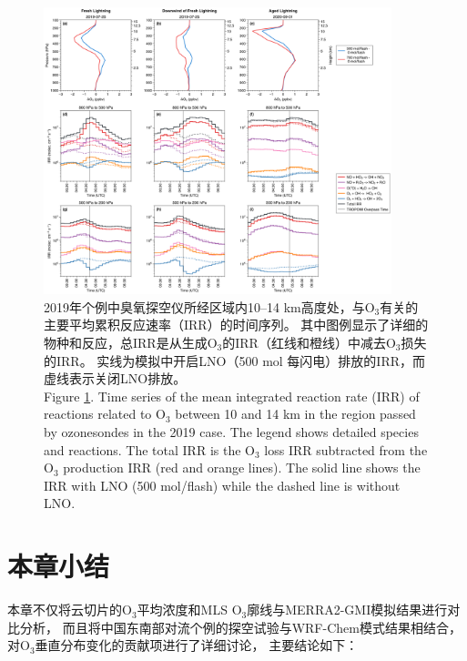 \begin{figure}[H]
\centering
\includegraphics[width=0.9\textwidth]{./figures/irr_timeseries.png}
\caption{
2019年个例中臭氧探空仪所经区域内10--14 km高度处，与O$_3$有关的主要平均累积反应速率（IRR）的时间序列。
其中图例显示了详细的物种和反应，总IRR是从生成O$_3$的IRR（红线和橙线）中减去O$_3$损失的IRR。
实线为模拟中开启LNO（500 mol 每闪电）排放的IRR，而虚线表示关闭LNO排放。\\
Figure \ref{fig:irr_timeseries}. Time series of the mean integrated reaction rate (IRR) of reactions related to O$_3$ between 10 and 14 km in the region passed by ozonesondes in the 2019 case.
The legend shows detailed species and reactions.
The total IRR is the O$_3$ loss IRR subtracted from the O$_3$ production IRR (red and orange lines).
The solid line shows the IRR with LNO (500 mol/flash) while the dashed line is without LNO.
}
\label{fig:irr_timeseries}
\end{figure}


\section{本章小结}

本章不仅将云切片的O$_3$平均浓度和MLS O$_3$廓线与MERRA2-GMI模拟结果进行对比分析，
而且将中国东南部对流个例的探空试验与WRF-Chem模式结果相结合，对O$_3$垂直分布变化的贡献项进行了详细讨论，
主要结论如下：

